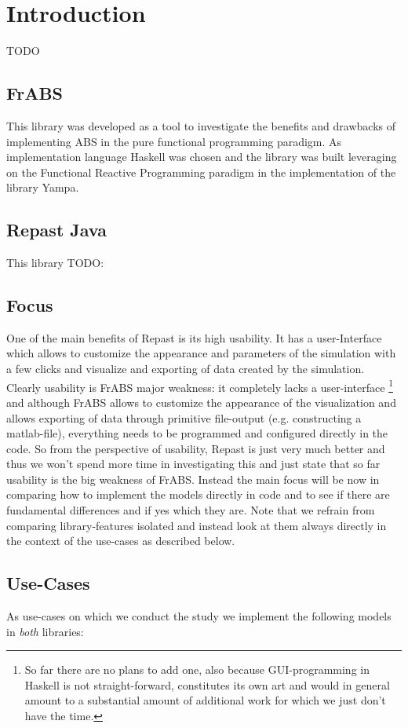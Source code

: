 \section{Introduction}

TODO

\subsection{FrABS}
This library was developed as a tool to investigate the benefits and drawbacks of implementing ABS in the pure functional programming paradigm. As implementation language Haskell was chosen and the library was built leveraging on the Functional Reactive Programming paradigm in the implementation of the library Yampa.

\subsection{Repast Java}
This library TODO:

\subsection{Focus}
One of the main benefits of Repast is its high usability. It has a user-Interface which allows to customize the appearance and parameters of the simulation with a few clicks and visualize and exporting of data created by the simulation. Clearly usability is FrABS major weakness: it completely lacks a user-interface \footnote{So far there are no plans to add one, also because GUI-programming in Haskell is not straight-forward, constitutes its own art and would in general amount to a substantial amount of additional work for which we just don't have the time.} and although FrABS allows to customize the appearance of the visualization and allows exporting of data through primitive file-output (e.g. constructing a matlab-file), everything needs to be programmed and configured directly in the code. So from the perspective of usability, Repast is just very much better and thus we won't spend more time in investigating this and just state that so far usability is the big weakness of FrABS. 
Instead the main focus will be now in comparing how to implement the models directly in code and to see if there are fundamental differences and if yes which they are. Note that we refrain from comparing library-features isolated and instead look at them always directly in the context of the use-cases as described below.

\subsection{Use-Cases}
As use-cases on which we conduct the study we implement the following models in \textit{both} libraries:

